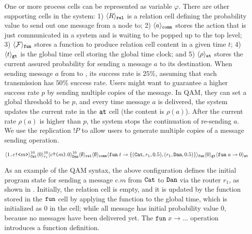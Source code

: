One or more process cells can be represented as variable $\varphi$.
There are other supporting cells in the system:
1) $\langle R \rangle_{\texttt{rel}}$ is a relation cell defining the probability value to send out one message from a node to;
2) $\langle a \rangle_{\texttt{comm}}$ stores the action that is just communicated in a system and is waiting to be popped up to the top level;
3) $\langle \mathcal{F} \rangle_{\texttt{fun}}$ stores a function to produce relation cell content in a given time $t$;
4) $\langle t \rangle_{\texttt{gt}}$ is the global time cell storing the global time clock;
and 5) $\langle \rho \rangle_{\texttt{at}}$ stores the current assured probability for sending a message $a$ to its destination.
When sending message $a$ from  to , its success rate is $25\%$, assuming that each transmission has $50\%$ success rate. 
Users might want to guarantee a higher success rate $p$ by sending multiple copies of the message.
In QAM, they can set a global threshold to be $p$, and every time message $a$ is delivered, 
the system updates the current rate in the $\texttt{at}$ cell (the content is $\rho(a)$).
After the current rate $\rho(a)$ is higher than $p$, the system stops the continuation of re-sending $a$.
We use the replication $!P$ to allow users to generate multiple copies of a message sending operation. 

{\footnotesize
\[
\langle 1\texttt{.}c\texttt{!<}m\texttt{>} \rangle^{10}_{\texttt{Cat}}\langle 0 \rangle^{10}_{r_1}
\langle c\texttt{?(}m\texttt{)}.0 \rangle^{10}_{\texttt{Dan}} 
\langle \emptyset \rangle_{\texttt{rel}}
\langle \emptyset \rangle_{\texttt{comm}}
\langle \texttt{fun}\;t\to\{(\texttt{Cat},r_1,0.5), (r_1,\texttt{Dan},0.5)\} \rangle_{\texttt{fun}}
\langle 0 \rangle_{\texttt{gt}}
\langle \texttt{fun}\;a\to 0 \rangle_{\texttt{at}}
\]
}

As an example of the QAM syntax, the above configuration defines the initial program state for sending a message $c.m$ from $\texttt{Cat}$ to $\texttt{Dan}$ via the router $r_1$, as shown in . Initially, the relation cell is empty, and it is updated by the function stored in the $\texttt{fun}$ cell by applying the function to the global time, which is initialized as $0$ in the  cell;
while all message has initial probability value $0$, because no messages have been delivered yet.
The $\texttt{fun}\;x\to ...$ operation introduces a function definition.

